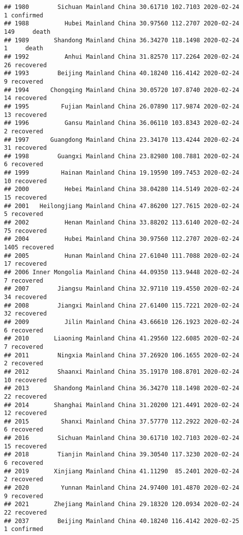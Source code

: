 \documentclass[
]{article}
\begin{document}
\begin{verbatim}
## 1980        Sichuan Mainland China 30.61710 102.7103 2020-02-24     1 confirmed
## 1988          Hubei Mainland China 30.97560 112.2707 2020-02-24   149     death
## 1989       Shandong Mainland China 36.34270 118.1498 2020-02-24     1     death
## 1992          Anhui Mainland China 31.82570 117.2264 2020-02-24    26 recovered
## 1993        Beijing Mainland China 40.18240 116.4142 2020-02-24     9 recovered
## 1994      Chongqing Mainland China 30.05720 107.8740 2020-02-24    14 recovered
## 1995         Fujian Mainland China 26.07890 117.9874 2020-02-24    13 recovered
## 1996          Gansu Mainland China 36.06110 103.8343 2020-02-24     2 recovered
## 1997      Guangdong Mainland China 23.34170 113.4244 2020-02-24    31 recovered
## 1998        Guangxi Mainland China 23.82980 108.7881 2020-02-24     6 recovered
## 1999         Hainan Mainland China 19.19590 109.7453 2020-02-24    10 recovered
## 2000          Hebei Mainland China 38.04280 114.5149 2020-02-24    15 recovered
## 2001   Heilongjiang Mainland China 47.86200 127.7615 2020-02-24     5 recovered
## 2002          Henan Mainland China 33.88202 113.6140 2020-02-24    75 recovered
## 2004          Hubei Mainland China 30.97560 112.2707 2020-02-24  1405 recovered
## 2005          Hunan Mainland China 27.61040 111.7088 2020-02-24    17 recovered
## 2006 Inner Mongolia Mainland China 44.09350 113.9448 2020-02-24     7 recovered
## 2007        Jiangsu Mainland China 32.97110 119.4550 2020-02-24    34 recovered
## 2008        Jiangxi Mainland China 27.61400 115.7221 2020-02-24    32 recovered
## 2009          Jilin Mainland China 43.66610 126.1923 2020-02-24     6 recovered
## 2010       Liaoning Mainland China 41.29560 122.6085 2020-02-24     7 recovered
## 2011        Ningxia Mainland China 37.26920 106.1655 2020-02-24     2 recovered
## 2012        Shaanxi Mainland China 35.19170 108.8701 2020-02-24    10 recovered
## 2013       Shandong Mainland China 36.34270 118.1498 2020-02-24    22 recovered
## 2014       Shanghai Mainland China 31.20200 121.4491 2020-02-24    12 recovered
## 2015         Shanxi Mainland China 37.57770 112.2922 2020-02-24     6 recovered
## 2016        Sichuan Mainland China 30.61710 102.7103 2020-02-24    15 recovered
## 2018        Tianjin Mainland China 39.30540 117.3230 2020-02-24     6 recovered
## 2019       Xinjiang Mainland China 41.11290  85.2401 2020-02-24     2 recovered
## 2020         Yunnan Mainland China 24.97400 101.4870 2020-02-24     9 recovered
## 2021       Zhejiang Mainland China 29.18320 120.0934 2020-02-24    22 recovered
## 2037        Beijing Mainland China 40.18240 116.4142 2020-02-25     1 confirmed

\end{verbatim}
\end{document}
